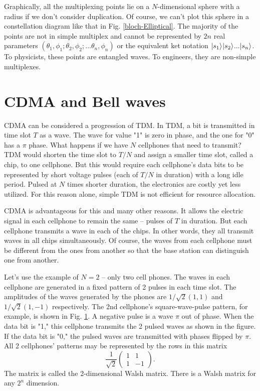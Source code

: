 \documentclass[oneside, letter, 12pt]{book}
\begin{document}
Graphically, all the multiplexing points lie on a $N$-dimensional sphere with a radius if we don't consider duplication. Of course, we can't plot this sphere in a constellation diagram like that in Fig. \ref{bloch-Elliptical}. The majority of the points are not in simple multiplex and cannot be represented by $2n$ real parameters $(\theta_1, \phi_1; \theta_2, \phi_2; ... \theta_n, \phi_n)$ or the equivalent ket notation $\vert {s_1} \rangle_{} \vert {s_2} \rangle_{} ... \vert {s_n} \rangle_{}$. To physicists, these points are entangled waves. To engineers, they are non-simple multiplexes.

\section{CDMA and Bell waves}
CDMA can be considered a progression of TDM. In TDM, a bit is transmitted in time slot $T$ as a wave. The wave for value "1" is zero in phase, and the one for "0" has a $\pi$ phase. What happens if we have $N$ cellphones that need to transmit? TDM would shorten the time slot to $T/N$ and assign a smaller time slot, called a chip, to one cellphone. But this would require each cellphone's data bits to be represented by short voltage pulses (each of $T/N$ in duration) with a long idle period. Pulsed at $N$ times shorter duration, the electronics are costly yet less utilized. For this reason alone, simple TDM is not efficient for resource allocation.

CDMA is advantageous for this and many other reasons. It allows the electric signal in each cellphone to remain the same -- pulses of $T$ in duration. But each cellphone transmits a wave in each of the chips. In other words, they all transmit waves in all chips simultaneously. Of course, the waves from each cellphone must be different from the ones from another so that the base station can distinguish one from another.

Let's use the example of $N=2$ -- only two cell phones. The waves in each cellphone are generated in a fixed pattern of 2 pulses in each time slot. The amplitudes of the waves generated by the phones are $1/{\sqrt{2}} (1,1)$ and $1/{\sqrt{2}} (1,-1)$ respectively. The 2nd cellphone's square-wave-pulse pattern, for example, is shown in Fig. \ref{}. A negative pulse is a wave $\pi$ out of phase. When the data bit is "1," this cellphone transmits the 2 pulsed waves as shown in the figure. If the data bit is "0," the pulsed waves are transmitted with phases flipped by $\pi$. All 2 cellphones' patterns may be represented by the rows in this matrix
\begin{equation}\label{e-CDMA2}
   \frac 1 {\sqrt{2}} \begin{pmatrix} %
    1 & 1  \\
    1 & -1
    \end{pmatrix}.
\end{equation}
The matrix is called the 2-dimensional Walsh matrix. There is a Walsh matrix for any $2^n$ dimension.
\end{document}
